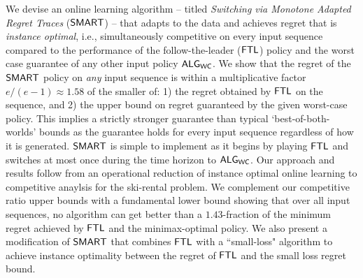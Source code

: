 We devise an online learning algorithm -- titled \emph{Switching via Monotone Adapted Regret Traces} ($\mathsf{SMART}$) -- that adapts to the data and achieves regret that is \emph{instance optimal}, i.e., simultaneously competitive on every input sequence compared to the performance of the follow-the-leader ($\mathsf{FTL}$) policy and the worst case guarantee of any other input policy $\mathsf{ALG}_{\mathsf{WC}}$.  
We show that the regret of the $\mathsf{SMART}$ policy on \emph{any} input sequence is within a multiplicative factor $e/(e-1) \approx 1.58$ of the smaller of: 1) the regret obtained by $\mathsf{FTL}$ on the sequence, and 2) the upper bound on regret guaranteed by the given worst-case policy. This implies a strictly stronger guarantee than typical `best-of-both-worlds' bounds as the guarantee holds for every input sequence regardless of how it is generated. $\mathsf{SMART}$ is simple to implement as it begins by playing $\mathsf{FTL}$ and switches at most once during the time horizon to $\mathsf{ALG}_{\mathsf{WC}}$. Our approach and results follow from an operational reduction of instance optimal online learning to competitive anaylsis for the ski-rental problem. 
We complement our competitive ratio upper bounds with a fundamental lower bound showing that over all input sequences, no algorithm can get better than a $1.43$-fraction of the minimum regret achieved by $\mathsf{FTL}$ and the minimax-optimal policy.
We also present a modification of $\mathsf{SMART}$ that combines $\mathsf{FTL}$ with a ``small-loss" algorithm to achieve instance optimality between the regret of $\mathsf{FTL}$ and the small loss regret bound. 
